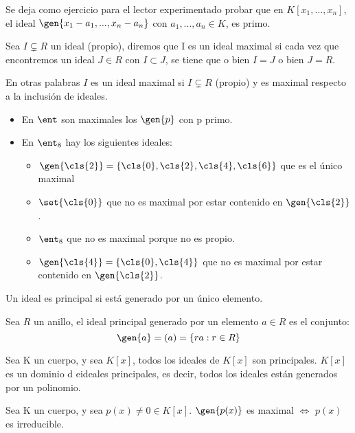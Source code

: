 Se deja como ejercicio para el lector experimentado probar que en $K[x_1,...,x_n]$, el ideal $\gen{x_1-a_1,...,x_n-a_n}$ con $a_1,...,a_n \in K$, es primo.

\begin{defn}
	Sea $I \subsetneq R$ un ideal (propio), diremos que I es un ideal maximal si cada vez que encontremos un ideal $J \in R$ con $I \subset J$, se tiene que o bien $I=J$ o bien $J=R$.

	En otras palabras $I$ es un ideal maximal si $I \subsetneq R$  (propio) y es maximal respecto a la inclusión de ideales.
\end{defn}

\begin{example}
	\begin{itemize}
		\item En $\ent$ son maximales los $\gen{p}$ con p primo.
		\item En $\ent_8$ hay los siguientes ideales:
		\begin{itemize}
			\item $\gen{\cls{2}}=\{\cls{0},\cls{2},\cls{4},\cls{6} \}$ que es el único maximal
			\item $\set{\cls{0}}$ que no es maximal por estar contenido en $\gen{\cls{2}}$.
			\item $\ent_8$ que no es maximal porque no es propio.
			\item $\gen{\cls{4}}=\{\cls{0},\cls{4} \}$ que no es maximal por estar contenido en $\gen{\cls{2}}$.
		\end{itemize}
	\end{itemize}
\end{example}

\begin{defn}
	Un ideal es principal si está generado por un único elemento.
\end{defn}

\begin{example}
	Sea $R$ un anillo, el ideal principal generado por un elemento $a \in R$ es el conjunto:
	$$ \gen{a}=(a)=\{ra: r \in R \} $$
\end{example}

\begin{prop}
	Sea K un cuerpo, y sea $K[x]$, todos los ideales de $K[x]$ son principales. $K[x]$ es un dominio d eideales principales, es decir, todos los ideales están generados por un polinomio.
\end{prop}

\begin{prop}
Sea K un cuerpo, y sea $p(x)\neq 0 \in K[x]$. $\gen{p(x)}$ es maximal $\Leftrightarrow$ $p(x)$ es irreducible.
\end{prop}

